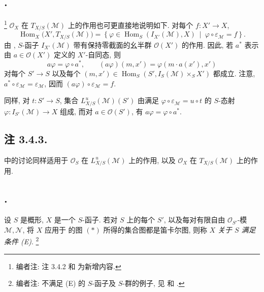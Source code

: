 \subsection*{.}
\footnote{编者注: 注 3.4.2 和  为新增内容.}
\(\mathcal O_X\) 在 \(T_{X/S}(\mathcal M)\) 上的作用也可更直接地说明如下.
对每个 \(f:X'\to X\),
\[
  \operatorname{Hom}_X\bigl(X',T_{X/S}(\mathcal M)\bigr)
  =\left\{\varphi\in
    \operatorname{Hom}_S(I_{X'}(\mathcal M),X)
    \ \middle|\ \varphi\circ\varepsilon_{\mathcal M}=f\right\}.
\]
由 , \(S\)-函子
\(I_{X'}(\mathcal M)\) 带有保持零截面的幺半群 \(\mathcal O(X')\) 的作用.
因此, 若 \(a^*\) 表示由 \(a\in\mathcal O(X')\) 定义的
\(X'\)-自同态, 则
\[
  a\varphi=\varphi\circ a^*,
  \qquad
  (a\varphi)(m,x')=\varphi(m\cdot a(x'),x')
\]
对每个 \(S'\to S\) 以及每个
\((m,x')\in\operatorname{Hom}_S
  (S',I_S(\mathcal M)\times_S X')\) 都成立.
注意, \(a^*\circ\varepsilon_{\mathcal M}=\varepsilon_{\mathcal M}\), 因而
\((a\varphi)\circ\varepsilon_{\mathcal M}=f\).

同样, 对 \(t:S'\to S\), 集合
\(L^u_{X/S}(\mathcal M)(S')\) 由满足
\(\varphi\circ\varepsilon_{\mathcal M}=u\circ t\) 的 \(S\)-态射
\(\varphi:I_{S'}(\mathcal M)\to X\) 组成,
而对 \(a\in\mathcal O(S')\), 有 \(a\varphi=\varphi\circ a^*\).

\subsection*{注 3.4.3.}
\footnotemark[21]
 中的讨论同样适用于
\(\mathcal O_S\) 在 \(L^u_{X/S}(\mathcal M)\) 上的作用,
以及 \(\mathcal O_X\) 在 \(T_{X/S}(\mathcal M)\) 上的作用.

\subsection*{.}
设 \(S\) 是概形, \(X\) 是一个 \(S\)-函子.
若对 \(S\) 上的每个 \(S'\), 以及每对有限自由
\(\mathcal O_{S'}\)-模 \(\mathcal M,\mathcal N\),
将 \(X\) 应用于  的图 \((*)\)
所得的集合图都是笛卡尔图, 则称 \(X\) \emph{关于 \(S\) 满足条件 (E)}.
\footnote{编者注: 不满足 (E) 的 \(S\)-函子及 \(S\)-群的例子,
见  和 .}

